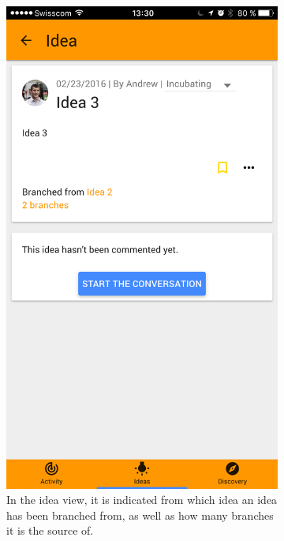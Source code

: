 \documentclass[a4paper,12pt, oneside]{article}
\begin{document}
\begin{figure}[!htb]
    \begin{subfigure}[t]{.48\textwidth}
        \centering
        \includegraphics[width=.67\textwidth]{images/branches_idea.png}
        \caption{In the idea view, it is indicated from which idea an idea has been branched from, as well as how many branches it is the source of.}
    \end{subfigure}
    \hfill
    \begin{subfigure}[t]{.48\textwidth}
        \centering

\end{subfigure}
\end{figure}
\end{document}
